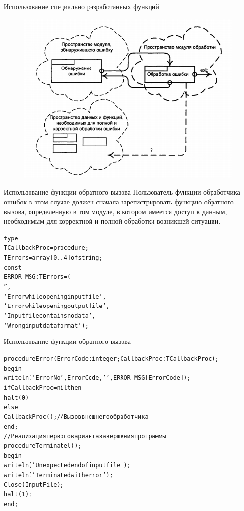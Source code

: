 \documentclass{beamer}
\begin{document}
\begin{frame}{Использование специально разработанных функций}
\begin{figure}[h]
\centering
\includegraphics[scale=0.6]{images/lec08-pic04.png}
\end{figure}
\end{frame}

\begin{frame}[fragile]{Использование функции обратного вызова}
Пользователь функции-обработчика ошибок в этом случае должен сначала зарегистрировать функцию обратного вызова, определенную в том модуле, в котором имеется доступ к данным, необходимым для корректной и полной обработки возникшей ситуации. 
\begin{alltt}
type
  TCallbackProc = procedure;
  TErrors = array[0..4] of string;
const
  ERROR_MSG: TErrors = (
    '',
    'Error while opening input file',
    'Error while opening output file',
    'Input file contains no data',
    'Wrong input data format');   
\end{alltt}
\end{frame}

\begin{frame}[fragile]{Использование функции обратного вызова}
\begin{alltt}
procedure Error(ErrorCode: integer; CallbackProc: TCallbackProc);
begin
  writeln('Error No', ErrorCode, ' ', ERROR_MSG[ErrorCode]);
  if CallbackProc = nil then
    halt(0)
  else
    CallbackProc();   //Вызов внешнего обработчика
end;
// Реализация первого варианта завершения программы
procedure Terminatel();
begin
  writeln('Unexpected end of input file');
  writeln('Terminated with error');
  Close(InputFile);
  halt(1);
end;
\end{alltt}
\end{frame}
\end{document}
